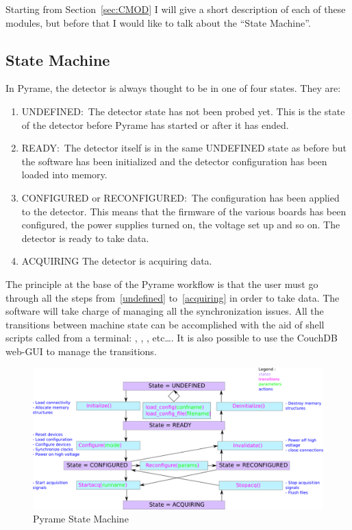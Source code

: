 Starting from Section~\ref{sec:CMOD} I will give a short description of each of
these modules, but before that I would like to talk about the ``State Machine''.

\subsection{State Machine}
In Pyrame, the detector is always thought to be in one of four states. They are:
\begin{enumerate}
\item\label{undefined} UNDEFINED:\ The detector state has not been probed
  yet. This is the state of the detector before Pyrame has started or after it
  has ended.
\item READY:\ The detector itself is in the same UNDEFINED state as before but
  the software has been initialized and the detector configuration has been
  loaded into memory.
\item CONFIGURED or RECONFIGURED:\ The configuration has been applied to the
  detector. This means that the firmware of the various boards has been
  configured, the power supplies turned on, the voltage set up and so on. The
  detector is ready to take data.
\item\label{acquiring} ACQUIRING The detector is acquiring data.
\end{enumerate}
The principle at the base of the Pyrame workflow is that the user must go
through all the steps from~\ref{undefined} to~\ref{acquiring} in order to take
data. The software will take charge of managing all the synchronization issues.
All the transitions between machine state can be accomplished with the aid of
shell scripts called from a terminal: ,
, , etc\dots. It is also
possible to use the CouchDB web-GUI to manage the transitions.
\begin{figure}
  \includegraphics[frame,width=\linewidth]{state_machine.doc.png}
  \caption{Pyrame State Machine}\label{fig:state-machine}
\end{figure}

